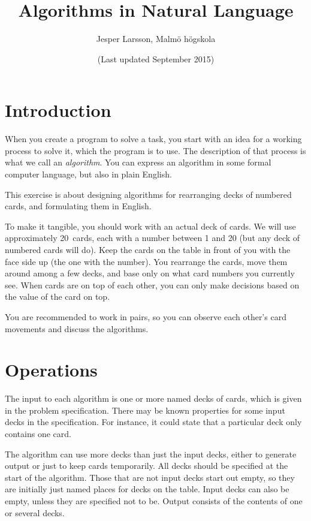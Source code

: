 \documentclass[a4paper,twoside]{tufte-handout}
\title{Algorithms in Natural Language}
\author{Jesper Larsson, Malmö högskola}
\date{(Last updated September 2015)}
\begin{document}
\maketitle

\section{Introduction}\label{sec-intro}

When you create a program to solve a task, you start with an idea for
a working process to solve it, which the program is to use. The
description of that process is what we call an \emph{algorithm}. You
can express an algorithm in some formal computer language, but also in
plain English.

This exercise is about designing algorithms for rearranging decks of
numbered cards, and formulating them in English.

To make it tangible, you should work with an actual deck of cards. We
will use approximately 20~cards, each with a number between 1 and 20
(but any deck of numbered cards will do). Keep the cards on the table
in front of you with the face side up (the one with the number). You
rearrange the cards, move them around among a few decks, and base
only on what card numbers you currently see. When
cards are on top of each other, you can only make decisions based on
the value of the card on top.

You are recommended to work in pairs, so you can observe each
other's card movements and discuss the algorithms.

\section{Operations}\label{sec-ops}

The input to each algorithm is one or more named decks of cards, which
is given in the problem specification. There may be known properties
for some input decks in the specification. For instance, it could
state that a particular deck only contains one card.

The algorithm can use more decks than just the input decks, either to
generate output or just to keep cards temporarily. All decks should be
specified at the start of the algorithm. Those that are not input
decks start out empty, so they are initially just named places for
decks on the table. Input decks can also be empty, unless they are specified
not to be. Output consists of the contents of one or several decks.
\end{document}
